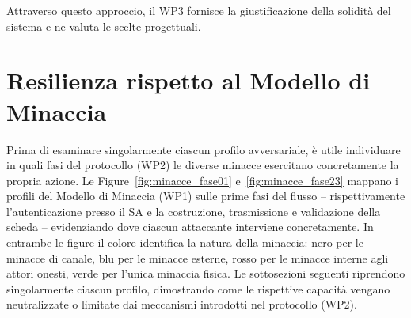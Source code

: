 Attraverso questo approccio, il WP3 fornisce la giustificazione della solidità del sistema e ne valuta le scelte progettuali.

\section{Resilienza rispetto al Modello di Minaccia}
\label{sec:3.2_resilienza_minacce}

Prima di esaminare singolarmente ciascun profilo avversariale, è utile individuare in quali fasi del protocollo (WP2) le diverse minacce esercitano concretamente la propria azione. Le Figure~\ref{fig:minacce_fase01} e~\ref{fig:minacce_fase23} mappano i profili del Modello di Minaccia (WP1) sulle prime fasi del flusso -- rispettivamente l'autenticazione presso il SA e la costruzione, trasmissione e validazione della scheda -- evidenziando dove ciascun attaccante interviene concretamente. In entrambe le figure il colore identifica la natura della minaccia: nero per le minacce di canale, blu per le minacce esterne, rosso per le minacce interne agli attori onesti, verde per l'unica minaccia fisica. Le sottosezioni seguenti riprendono singolarmente ciascun profilo, dimostrando come le rispettive capacità vengano neutralizzate o limitate dai meccanismi introdotti nel protocollo (WP2).

